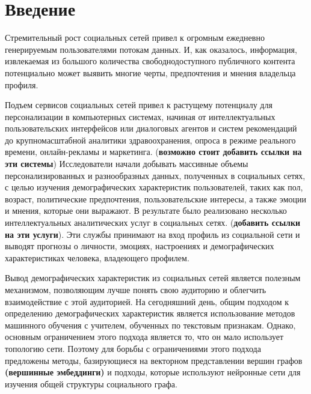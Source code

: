\section{Введение}
Стремительный рост социальных сетей привел к огромным ежедневно генерируемым пользователями потокам данных. И, как оказалось, информация, извлекаемая из большого количества свободнодоступного публичного контента потенциально может выявить многие черты, предпочтения и мнения владельца профиля.

Подъем сервисов социальных сетей привел к растущему потенциалу
для персонализации в компьютерных системах, начиная от
интеллектуальных пользовательских интерфейсов или диалоговых агентов и
систем рекомендаций до крупномасштабной аналитики здравоохранения,
опроса в режиме реального времени, онлайн-рекламы и маркетинга. (\textbf{возможно стоит добавить ссылки на эти системы})
Исследователи начали добывать массивные объемы персонализированных и
разнообразных данных, полученных в социальных сетях, с целью изучения
демографических характеристик пользователей, таких как пол, возраст,
политические предпочтения, пользовательские
интересы, а также эмоции и мнения, которые они выражают. В результате
было реализовано несколько интеллектуальных аналитических услуг в
социальных сетях. (\textbf{добавить ссылки на эти услуги}). Эти службы принимают на вход профиль из социальной
сети и выводят прогнозы о личности, эмоциях, настроениях и
демографических характеристиках человека, владеющего профилем.

Вывод демографических характеристик из социальных сетей является полезным механизмом, позволяющим лучше понять свою аудиторию и облегчить взаимодействие с этой аудиторией.  На сегодняшний день, общим подходом к определению демографических характеристик является использование методов машинного обучения с учителем, обученных по текстовым признакам. Однако, основным ограничением этого подхода является то, что он мало использует топологию сети. Поэтому для борьбы с ограничениями этого подхода предложены методы, базирующиеся на векторном представлении вершин графов \textbf{(вершинные эмбеддинги)} и подходы, которые используют нейронные сети для изучения общей структуры социального графа.

\clearpage
